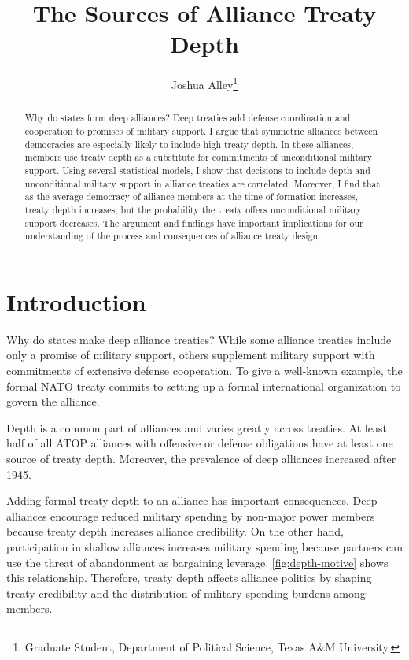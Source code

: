 \documentclass[12pt]{article}
\title{\textbf{The Sources of Alliance Treaty Depth}}
\author{Joshua Alley\footnote{Graduate Student,
Department of Political Science, Texas A\&M University.}}
\date{}
\begin{document}
\maketitle 

\doublespace 

\begin{abstract}
Why do states form deep alliances? 
Deep treaties add defense coordination and cooperation to promises of military support.
I argue that symmetric alliances between democracies are especially likely to include high treaty depth. 
In these alliances, members use treaty depth as a substitute for commitments of unconditional military support.
Using several statistical models, I show that decisions to include depth and unconditional military support in alliance treaties are correlated.
Moreover, I find that as the average democracy of alliance members at the time of formation increases, treaty depth increases, but the probability the treaty offers unconditional military support decreases. 
The argument and findings have important implications for our understanding of the process and consequences of alliance treaty design. 
\end{abstract}


\newpage 


\section{Introduction}


Why do states make deep alliance treaties? 
While some alliance treaties include only a promise of military support, others supplement military support with commitments of extensive defense cooperation. 
To give a well-known example, the formal NATO treaty commits to setting up a formal international organization to govern the alliance. 


Depth is a common part of alliances and varies greatly across treaties. 
At least half of all ATOP alliances with offensive or defense obligations have at least one source of treaty depth.
Moreover, the prevalence of deep alliances increased after 1945. 


Adding formal treaty depth to an alliance has important consequences. 
Deep alliances encourage reduced military spending by non-major power members because treaty depth increases alliance credibility.  
On the other hand, participation in shallow alliances increases military spending because partners can use the threat of abandonment as bargaining leverage. 
\autoref{fig:depth-motive} shows this relationship. 
Therefore, treaty depth affects alliance politics by shaping treaty credibility and the distribution of military spending burdens among members. 
\end{document}
